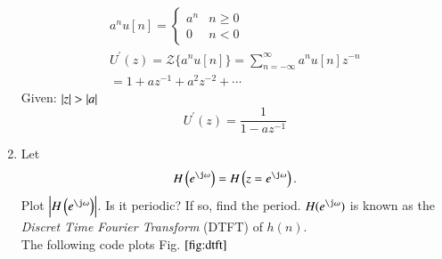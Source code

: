 \documentclass[journal,12pt,twocolumn]{IEEEtran}
\renewcommand\thesection{\arabic{section}}
\begin{document}
\begin{enumerate}[label=\thesection.\arabic*]
		\solution
		\begin{align}
			a^{n}u[n] = \begin{cases} a^{n} & n \geq 0 \\
				0 & n<0\end{cases} \\
			U^{\prime}(z)={\mathcal{Z}}\{a^{n}u[n]\}=\sum_{n=-\infty}^{\infty} a^{n}u[n] z^{-n}\\
			=1+az^{-1}+a^{2}z^{-2}+\cdots
		\end{align}
Given: $\left\vert z\right\vert > \left\vert a\right\vert$\\
		\begin{equation}
			\label{eq:U'} 
			U^{\prime}(z)=\frac{1}{1-a z^{-1}}
		\end{equation}
		\item Let
		\begin{equation}
			H\brak{e^{\j \omega}} = H\brak{z = e^{\j \omega}}.
		\end{equation}
		Plot $\abs{H\brak{e^{\j \omega}}}$.  Is it periodic? If so, find the period. $H(e^{\j \omega})$ is
		known as the {\em Discret Time Fourier Transform} (DTFT) of $h(n)$.\\
		\solution The following code plots Fig. $\ref{fig:dtft}$
		

\end{enumerate}
\end{document}
